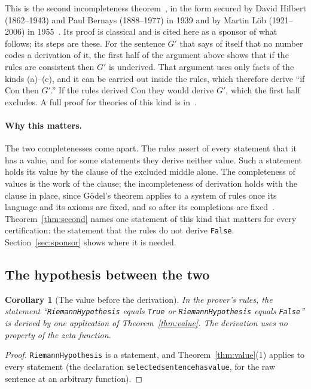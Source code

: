 \documentclass[11pt]{article}
\newtheorem{corollary}[theorem]{Corollary}
\theoremstyle{definition}
\theoremstyle{remark}
\DeclareRobustCommand{\lean}[1]{{\renewcommand{\_}{\textunderscore\allowbreak}\texttt{#1}}}
\newcommand{\True}{\lean{True}}
\newcommand{\False}{\lean{False}}
\begin{document}
\noindent This is the second incompleteness theorem~\citep{godel31}, in the form secured by David Hilbert (1862--1943) and Paul Bernays (1888--1977) in 1939 and by Martin L\"ob (1921--2006) in 1955~\citep{hilbertbernays,lob}. Its proof is classical and is cited here as a sponsor of what follows; its steps are these. For the sentence $G'$ that says of itself that no number codes a derivation of it, the first half of the argument above shows that if the rules are consistent then $G'$ is underived. That argument uses only facts of the kinds (a)--(c), and it can be carried out inside the rules, which therefore derive ``if $\mathrm{Con}$ then $G'$.'' If the rules derived $\mathrm{Con}$ they would derive $G'$, which the first half excludes. A full proof for theories of this kind is in~\citet{smorynski}.

\paragraph{Why this matters.} The two completenesses come apart. The rules assert of every statement that it has a value, and for some statements they derive neither value. Such a statement holds its value by the clause of the excluded middle alone. The completeness of values is the work of the clause; the incompleteness of derivation holds with the clause in place, since G\"odel's theorem applies to a system of rules once its language and its axioms are fixed, and so after its completions are fixed~\citep{tv,rhp}. Theorem~\ref{thm:second} names one statement of this kind that matters for every certification: the statement that the rules do not derive \False. Section~\ref{sec:sponsor} shows where it is needed.

\subsection{The hypothesis between the two}

\begin{corollary}[The value before the derivation]\label{cor:before}
In the prover's rules, the statement ``\lean{RiemannHypothesis} equals \True{} or \lean{RiemannHypothesis} equals \False'' is derived by one application of Theorem~\ref{thm:value}. The derivation uses no property of the zeta function.
\end{corollary}

\begin{proof}
\lean{RiemannHypothesis} is a statement, and Theorem~\ref{thm:value}(1) applies to every statement (the declaration \lean{selected\_sentence\_has\_value}, for the raw sentence at an arbitrary function).
\end{proof}
\end{document}
